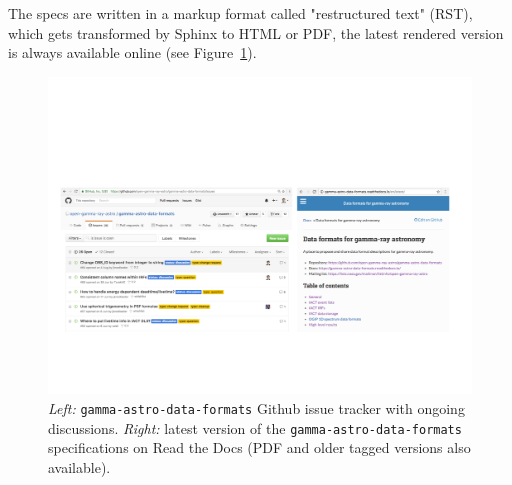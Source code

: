 The specs are written in a markup format called "restructured text" (RST),
which gets transformed by Sphinx to HTML or PDF, the latest rendered version is always available online (see Figure~\ref{fig:webpage}).

\begin{figure}[tb]
\centerline{\includegraphics[width=\textwidth]{figures/webpage}}
\caption{
\emph{Left:} \texttt{gamma-astro-data-formats} Github issue tracker with ongoing discussions. \emph{Right:} latest version of the \texttt{gamma-astro-data-formats} specifications on Read the Docs (PDF and older tagged versions also available).
}
\label{fig:webpage}
\end{figure}
